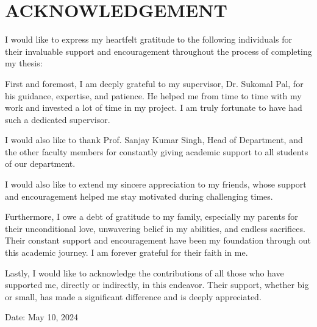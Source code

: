 \chapter*{\centering\normalsize ACKNOWLEDGEMENT}

\begin{flushleft}
I would like to express my heartfelt gratitude to the following individuals for their invaluable support and encouragement throughout the process of completing my thesis:

First and foremost, I am deeply grateful to my supervisor, Dr. Sukomal Pal, for his guidance, expertise, and patience. He helped me from time to time with my work and invested a lot of time in my project. I am truly fortunate to have had such a dedicated supervisor.

I would also like to thank Prof. Sanjay Kumar Singh, Head of Department, and the other faculty members for constantly giving academic support to all students of our department.

I would also like to extend my sincere appreciation to my friends, whose support and encouragement helped me stay motivated during challenging times.

Furthermore, I owe a debt of gratitude to my family, especially my parents for their unconditional love, unwavering belief in my abilities, and endless sacrifices. Their constant support and encouragement have been my foundation through out this academic journey. I am forever grateful for their faith in me.

Lastly, I would like to acknowledge the contributions of all those who have supported me, directly or indirectly, in this endeavor. Their support, whether big or small, has made a significant difference and is deeply appreciated.
\newline
\textbf{\theauthor{}}

Date: May 10, 2024

\end{flushleft}